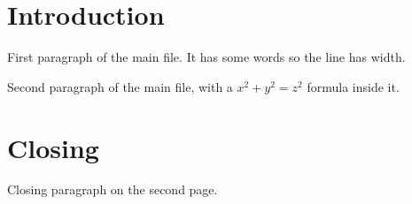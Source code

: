\documentclass{article}
\begin{document}
\section{Introduction}
First paragraph of the main file. It has some words so the line has width.

Second paragraph of the main file, with a $x^2 + y^2 = z^2$ formula inside it.

\newpage
\section{Closing}
Closing paragraph on the second page.

\end{document}
